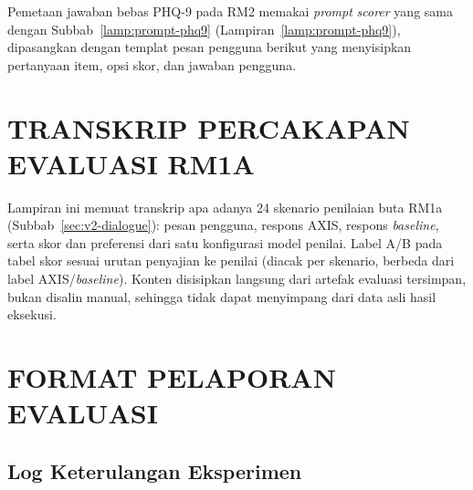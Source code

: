 Pemetaan jawaban bebas PHQ-9 pada RM2 memakai \textit{prompt} \textit{scorer} yang sama dengan Subbab~\ref{lamp:prompt-phq9} (Lampiran~\ref{lamp:prompt-phq9}), dipasangkan dengan templat pesan pengguna berikut yang menyisipkan pertanyaan item, opsi skor, dan jawaban pengguna.


\chapter{TRANSKRIP PERCAKAPAN EVALUASI RM1A}
\label{lamp:v2-rm1-transcript}

Lampiran ini memuat transkrip apa adanya 24 skenario penilaian buta RM1a (Subbab~\ref{sec:v2-dialogue}): pesan pengguna, respons AXIS, respons \textit{baseline}, serta skor dan preferensi dari satu konfigurasi model penilai. Label A/B pada tabel skor sesuai urutan penyajian ke penilai (diacak per skenario, berbeda dari label AXIS/\textit{baseline}). Konten disisipkan langsung dari artefak evaluasi tersimpan, bukan disalin manual, sehingga tidak dapat menyimpang dari data asli hasil eksekusi.



\chapter{FORMAT PELAPORAN EVALUASI}
\label{lamp:v2-reporting}

\section{Log Keterulangan Eksperimen}
\label{lamp:v2-run-log}

